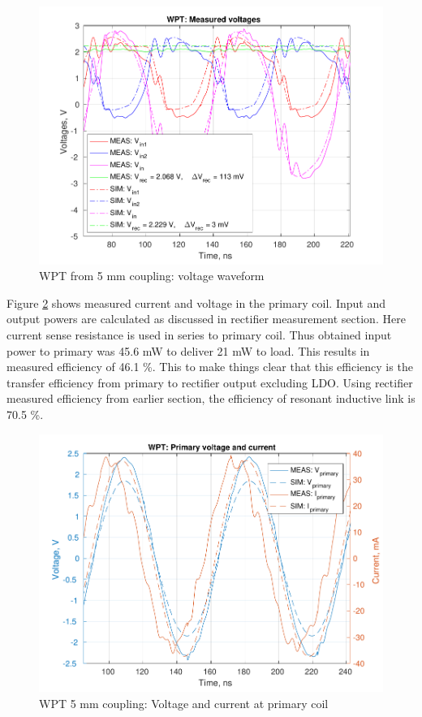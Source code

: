\documentclass[12pt,a4paper,UKenglish]{report}
\begin{document}
\begin{figure} [!htb]
  \centering
  \includegraphics[width=\textwidth]{img/meas/wpt5_vs.pdf} 
 \caption{WPT from 5 mm coupling: voltage waveform} 
\label{fig:meas_wpt5_vs} 
\end{figure}

Figure \ref{fig:meas_wpt5_current_pri}  shows measured current and voltage in the primary coil. Input and output powers are calculated as discussed in rectifier measurement section. Here current sense resistance is used in series to primary coil.  Thus obtained input power to primary  was 45.6 mW to deliver 21 mW to load. This results in measured efficiency of 46.1 \%. This to make things clear that this efficiency is the transfer efficiency from primary to rectifier output excluding LDO. Using rectifier measured efficiency from earlier section, the efficiency of resonant inductive link is  70.5  \%. \\

\begin{figure} [!htb]
  \centering
  \includegraphics[width=\textwidth]{img/meas/wpt5_current_pri_2.pdf} 
 \caption{WPT 5 mm coupling: Voltage and current at primary coil} 
\label{fig:meas_wpt5_current_pri} 
\end{figure}
\end{document}
